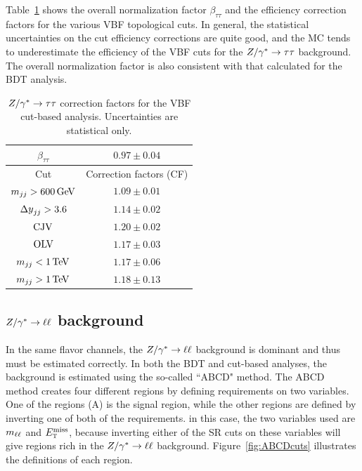 Table~\ref{tab:vbf_cb_zttnf} shows the overall normalization factor $\beta_{\tau\tau}$ and the efficiency correction factors for the various VBF topological cuts. In general, the statistical uncertainties on the cut efficiency corrections are quite good, and the MC tends to underestimate the efficiency of the VBF cuts for the $Z/\gamma^{\ast}\to\tau\tau$ background. The overall normalization factor is also consistent with that calculated for the BDT analysis.

\begin{table}[h!]
\centering
\captionsetup{justification=centering}
\begin{tabular}{|c|c|}
\hline
$\beta_{\tau\tau}$ & $0.97 \pm 0.04$ \\ \hline\hline
 Cut & Correction factors (CF) \\ \hline
$\mjj > 600 \GeV$ & $1.09 \pm 0.01$ \\ \hline
$\dyjj > 3.6 $ & $1.14 \pm 0.02$ \\ \hline
$\rm CJV$ & $1.20 \pm 0.02$ \\ \hline
$\rm OLV$ & $1.17 \pm 0.03$ \\ \hline
$\mjj < 1 \TeV$ & $1.17 \pm 0.06$ \\ \hline
$\mjj > 1 \TeV$ & $1.18 \pm 0.13$ \\ \hline 
\end{tabular}
\caption{$Z/\gamma^{\ast} \to\tau\tau$ correction factors for the VBF cut-based analysis. Uncertainties are statistical only.}
\label{tab:vbf_cb_zttnf}
\end{table}

\subsection{$Z/\gamma^{\ast} \to \ell\ell$ background}

In the same flavor channels, the $Z/\gamma^{\ast} \to \ell\ell$ background is dominant and thus must be estimated correctly. In both the BDT and cut-based analyses, the background is estimated using the so-called ``ABCD" method. The ABCD method creates four different regions by defining requirements on two variables. One of the regions (A) is the signal region, while the other regions are defined by inverting one of both of the requirements. in this case, the two variables used are $m_{\ell\ell}$ and $E_{\textrm{\footnotesize\sc t}}^{\rm miss}$, because inverting either of the SR cuts on these variables will give regions rich in the $Z/\gamma^{\ast}\to\ell\ell$ background. Figure~\ref{fig:ABCDcuts} illustrates the definitions of each region. 


